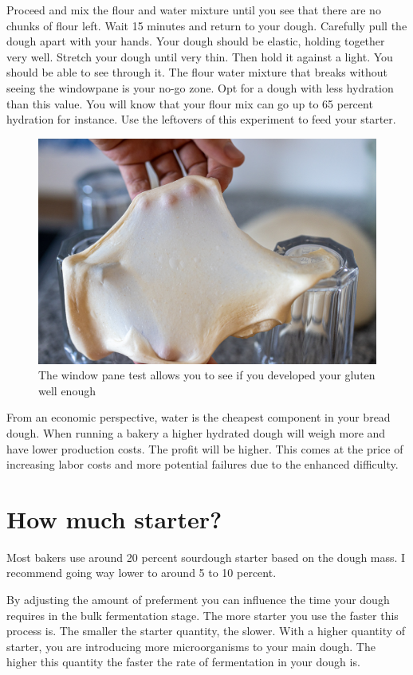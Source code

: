 Proceed and mix the flour and water mixture until you see that there
are no chunks of flour left. Wait 15 minutes and return to your dough.
Carefully pull the dough apart with your hands. Your dough should be elastic, holding
together very well. Stretch your dough until very thin. Then hold it against a light.
You should be able to see through it. The flour water mixture that breaks without
seeing the windowpane is your no-go zone. Opt for a dough with
less hydration than this value. You will know that your flour mix can go up to
65 percent hydration for instance. Use the leftovers of this experiment
to feed your starter.


\begin{figure}[!htb]
  \includegraphics[width=\textwidth]{window-pane-effect}
  \caption
    {The window pane test allows you to see if you developed your gluten well enough}
\end{figure}


From an economic perspective, water is the cheapest component in your bread
dough. When running a bakery a higher hydrated dough will weigh more and have
lower production costs. The profit will be higher. This comes at the price
of increasing labor costs and more potential failures due to the enhanced
difficulty.

\section{How much starter?}

Most bakers use around 20 percent sourdough starter based on the dough mass. I
recommend going way lower to around 5 to 10 percent.

By adjusting the amount of preferment you can influence the time your dough
requires in the bulk fermentation stage. The more starter you use the faster
this process is. The smaller the starter quantity, the slower. With a higher
quantity of starter, you are introducing more microorganisms to your main
dough. The higher this quantity the faster the rate of fermentation in your
dough is.

